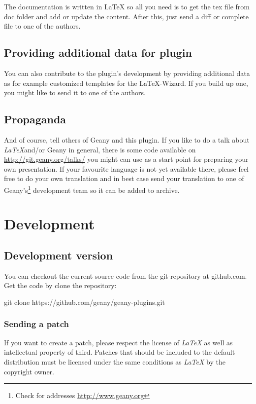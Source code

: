 \documentclass[%
paper=a4,%
fontsize=11pt,%
twoside=false,%
DIV18,%
headsepline,%
plainheadsepline,%
footsepline,%
plainfootsepline,%
bibliography=totoc,%
listof=totoc,%
BCOR10mm,%
parskip=half,%
openany,%
]{scrartcl}
\begin{document}
The documentation is written in \LaTeX{} so all you need is to get the
tex file from doc folder and add or update the content.
After this, just send a diff or complete file to one of the authors.


\subsection{Providing additional data for plugin}

You can also contribute to the plugin's development by providing
additional data as for example customized templates for the
\LaTeX-Wizard. If you build up one, you might like to send it to
one of the authors.

\subsection{Propaganda}
And of course, tell others of Geany and this plugin. If you like to do
a talk about \textit{LaTeX}and/or Geany in general, there is some code
available on \url{http://git.geany.org/talks/} you might can use as a
start point for preparing your own presentation. If your favourite
language is not yet available there, please feel free to do your own
translation and in best case send your translation to one of
Geany's\footnote{Check for addresses \url{http://www.geany.org}}
development team so it can be added to archive.


\section{Development}
\subsection{Development version}
You can checkout the current source code from the git-repository
at github.com. Get the code by clone the repository:

git clone https://github.com/geany/geany-plugins.git

\subsubsection{Sending a patch}
\label{sec:sending_a_patch}
If you want to create a patch, please respect the license of
\textit{LaTeX} as well as intellectual property of third. Patches that
should be included to the default distribution must be licensed under
the same conditions as \textit{LaTeX} by the copyright owner.
\end{document}

